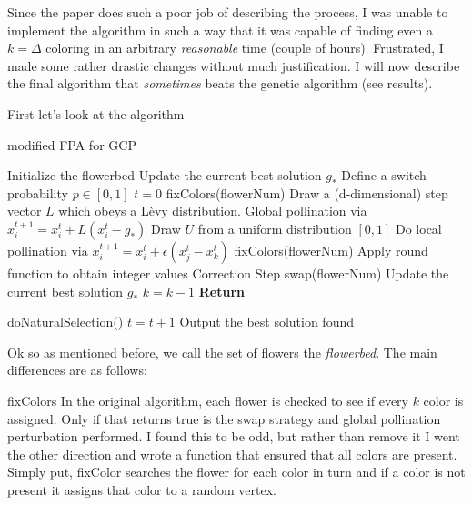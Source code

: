 Since the paper does such a poor job of describing the process, I was unable to implement the algorithm in such a way that it was capable of finding even a $k = \Delta$ coloring in an arbitrary \emph{reasonable} time (couple of hours). Frustrated, I made some rather drastic changes without much justification. I will now describe the final algorithm that \emph{sometimes} beats the genetic algorithm (see results).

First let's look at the algorithm

\begin{algorithm}[H]
    \caption{modified FPA for GCP}
    \label{FPA2}
    \begin{algorithmic}[1] %
         			
			\State Initialize the flowerbed
			\State Update the current best solution $g_*$
			\State Define a switch probability $p \in [0,1]$
			\State $t=0$
					\State fixColors(flowerNum)
					 
						\State Draw a (d-dimensional) step vector $L$ which obeys a L\`evy distribution.
						\State Global pollination via $x_i^{t+1} = x_i^{t} + L(x_i^{t} - g_*)$
					\Else
						\State Draw $U$ from a uniform distribution $[0,1]$
						\State Do local pollination via $x_i^{t+1} = x_i^{t} + \epsilon(x_j^{t} - x_k^{t})$
					\EndIf
					\State fixColors(flowerNum)
					\State Apply round function to obtain integer values
					\State Correction Step 
					 
						\State swap(flowerNum)
					\EndFor
				\EndFor
				\State Update the current best solution $g_*$
					\State $k = k-1$
					\State \textbf{Return}
				\EndIf

				doNaturalSelection()
				\State $t = t+1$
			\EndWhile
			\State Output the best solution found
		\EndProcedure
    \end{algorithmic}
\end{algorithm}

Ok so as mentioned before, we call the set of flowers the \emph{flowerbed}. The main differences are as follows:

fixColors
In the original algorithm, each flower is checked to see if every $k$ color is assigned. Only if that returns true is the swap strategy and global pollination perturbation performed. I found this to be odd, but rather than remove it I went the other direction and wrote a function that ensured that all colors are present. Simply put, fixColor searches the flower for each color in turn and if a color is not present it assigns that color to a random vertex.

